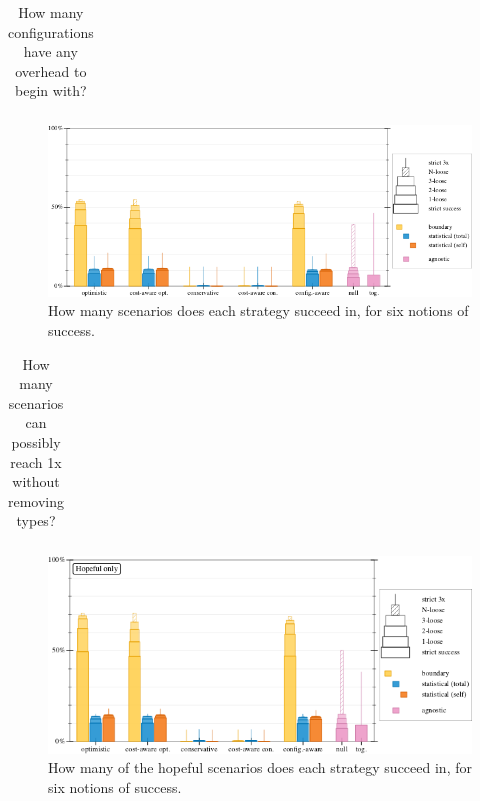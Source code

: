 \documentclass{article}
\begin{document}
\begin{table}[ht]\centering
  \caption{How many configurations have any overhead to begin with?}
  \label{t:baseline-trouble}
  \begin{tabular}{lrr}
    
  \end{tabular}
\end{table}

\begin{figure}[ht]
  \includegraphics[width=\columnwidth]{tex/strategy-overall-feasible.pdf}
  \caption{How many scenarios does each strategy succeed in, for six notions of success.}
  \label{f:strategy-overall}
\end{figure}

\begin{table}[ht]\centering
  \caption{How many scenarios can possibly reach 1x without removing types?}
  \label{t:blackhole}
  \begin{tabular}{lrr}
    
  \end{tabular}
\end{table}

\begin{figure}[ht]
  \includegraphics[width=\columnwidth]{tex/strategy-overall-hopeful.pdf}
  \caption{How many of the hopeful scenarios does each strategy succeed in, for six notions of success.}
  \label{f:strategy-hope}
\end{figure}
\end{document}
